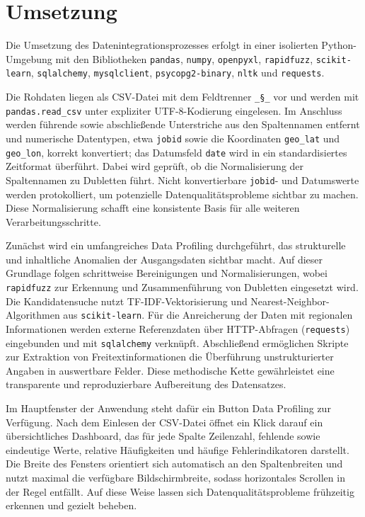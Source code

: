\documentclass[
    a4paper,
    12pt,
    headinclude=true,
    BCOR=10mm,
]{scrreprt}
\begin{document}
\chapter{Umsetzung}

Die Umsetzung des Datenintegrationsprozesses erfolgt in einer isolierten Python-Umgebung mit den Bibliotheken \texttt{pandas}, \texttt{numpy}, \texttt{openpyxl}, \texttt{rapidfuzz}, \texttt{scikit-learn}, \texttt{sqlalchemy}, \texttt{mysqlclient}, \texttt{psycopg2-binary}, \texttt{nltk} und \texttt{requests}.

Die Rohdaten liegen als CSV-Datei mit dem Feldtrenner \texttt{\_§\_} vor und werden mit \texttt{pandas.read\_csv} unter expliziter UTF-8-Kodierung eingelesen. Im Anschluss werden führende sowie abschließende Unterstriche aus den Spaltennamen entfernt und numerische Datentypen, etwa \texttt{jobid} sowie die Koordinaten \texttt{geo\_lat} und \texttt{geo\_lon}, korrekt konvertiert; das Datumsfeld \texttt{date} wird in ein standardisiertes Zeitformat überführt. Dabei wird geprüft, ob die Normalisierung der Spaltennamen zu Dubletten führt. Nicht konvertierbare \texttt{jobid}- und Datumswerte werden protokolliert, um potenzielle Datenqualitätsprobleme sichtbar zu machen. Diese Normalisierung schafft eine konsistente Basis für alle weiteren Verarbeitungsschritte.

Zunächst wird ein umfangreiches Data Profiling durchgeführt, das strukturelle und inhaltliche Anomalien der Ausgangsdaten sichtbar macht. Auf dieser Grundlage folgen schrittweise Bereinigungen und Normalisierungen, wobei \texttt{rapidfuzz} zur Erkennung und Zusammenführung von Dubletten eingesetzt wird. Die Kandidatensuche nutzt TF-IDF-Vektorisierung und Nearest-Neighbor-Algorithmen aus \texttt{scikit-learn}. Für die Anreicherung der Daten mit regionalen Informationen werden externe Referenzdaten über HTTP-Abfragen (\texttt{requests}) eingebunden und mit \texttt{sqlalchemy} verknüpft. Abschließend ermöglichen Skripte zur Extraktion von Freitextinformationen die Überführung unstrukturierter Angaben in auswertbare Felder. Diese methodische Kette gewährleistet eine transparente und reproduzierbare Aufbereitung des Datensatzes.

Im Hauptfenster der Anwendung steht dafür ein Button \glqq Data Profiling\grqq{} zur Verfügung. Nach dem Einlesen der CSV-Datei öffnet ein Klick darauf ein übersichtliches Dashboard, das für jede Spalte Zeilenzahl, fehlende sowie eindeutige Werte, relative Häufigkeiten und häufige Fehlerindikatoren darstellt. Die Breite des Fensters orientiert sich automatisch an den Spaltenbreiten und nutzt maximal die verfügbare Bildschirmbreite, sodass horizontales Scrollen in der Regel entfällt. Auf diese Weise lassen sich Datenqualitätsprobleme frühzeitig erkennen und gezielt beheben.
\end{document}

